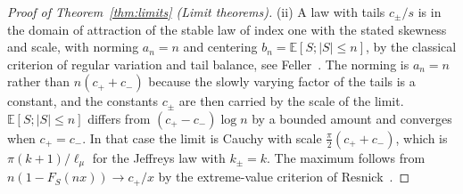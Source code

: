 \documentclass[sn-mathphys-num]{sn-jnl}\newcommand{\SNJNL}{}
\theoremstyle{thmstyleone}
\theoremstyle{thmstyletwo}
\theoremstyle{thmstylethree}
\theoremstyle{thmstyleone}
\providecommand{\E}{\mathbb{E}}
\begin{document}
\begin{appendices}
\begin{proof}[Proof of Theorem~\ref{thm:limits} (Limit theorems)]
			\noindent(ii) A law
			with tails $c_\pm/s$ is in the domain of attraction of the stable
			law of index one with the stated skewness and scale, with norming
			$a_n=n$ and centering $b_n=\E[S;|S|\le n]$, by the classical
			criterion of regular variation and tail balance, see Feller~\cite{feller1971}. The norming is
			$a_n=n$ rather than $n(c_++c_-)$ because the slowly varying factor
			of the tails is a constant, and the constants $c_\pm$ are then
			carried by the scale of the limit. $\E[S;|S|\le n]$ differs from
			$(c_+-c_-)\log n$ by a bounded amount and converges when $c_+=c_-$.
			In that case the limit is Cauchy with scale $\tfrac\pi2(c_++c_-)$,
			which is $\pi(k+1)/\ell_\mu$ for the Jeffreys law with $k_\pm=k$.
			The maximum follows from $n(1-F_S(nx))\to c_+/x$ by the
			extreme-value criterion of Resnick~\cite{resnick2007}.
		\end{proof}
		
	\end{appendices}
	
\end{document}
